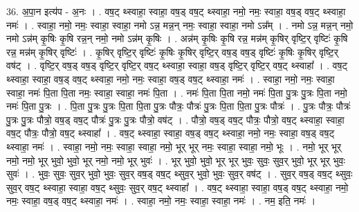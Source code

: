\documentclass[17pt]{extarticle}
\begin{document}
36. अ॒पा॒न इत्य॑प - अ॒नः । . वष॒ट् थ्स्वाहा॒ स्वाहा॒ वष॒ड् वष॒ट् थ्स्वाहा॒ नमो॒ नमः॒ स्वाहा॒ वष॒ड् वष॒ट् थ्स्वाहा॒ नमः॑ । . स्वाहा॒ नमो॒ नमः॒ स्वाहा॒ स्वाहा॒ नमो ऽन्न॒ मन्न॒न् नमः॒ स्वाहा॒ स्वाहा॒ नमो ऽन्न᳚म् । . नमो ऽन्न॒ मन्न॒न् नमो॒ नमो ऽन्न॑म् कृ॒षिः कृ॒षि रन्न॒न् नमो॒ नमो ऽन्न॑म् कृ॒षिः । . अन्न॑म् कृ॒षिः कृ॒षि रन्न॒ मन्न॑म् कृ॒षिर् वृष्टि॒र् वृष्टिः॑ कृ॒षि रन्न॒ मन्न॑म् कृ॒षिर् वृष्टिः॑ । . कृ॒षिर् वृष्टि॒र् वृष्टिः॑ कृ॒षिः कृ॒षिर् वृष्टि॒र् वष॒ड् वष॒ड् वृष्टिः॑ कृ॒षिः कृ॒षिर् वृष्टि॒र् वष॑ट् । . वृष्टि॒र् वष॒ड् वष॒ड् वृष्टि॒र् वृष्टि॒र् वष॒ट् थ्स्वाहा॒ स्वाहा॒ वष॒ड् वृष्टि॒र् वृष्टि॒र् वष॒ट् थ्स्वाहा᳚ । . वष॒ट् थ्स्वाहा॒ स्वाहा॒ वष॒ड् वष॒ट् थ्स्वाहा॒ नमो॒ नमः॒ स्वाहा॒ वष॒ड् वष॒ट् थ्स्वाहा॒ नमः॑ । . स्वाहा॒ नमो॒ नमः॒ स्वाहा॒ स्वाहा॒ नमः॑ पि॒ता पि॒ता नमः॒ स्वाहा॒ स्वाहा॒ नमः॑ पि॒ता । . नमः॑ पि॒ता पि॒ता नमो॒ नमः॑ पि॒ता पु॒त्रः पु॒त्रः पि॒ता नमो॒ नमः॑ पि॒ता पु॒त्रः । . पि॒ता पु॒त्रः पु॒त्रः पि॒ता पि॒ता पु॒त्रः पौत्रः॒ पौत्रः॑ पु॒त्रः पि॒ता पि॒ता पु॒त्रः पौत्रः॑ । . पु॒त्रः पौत्रः॒ पौत्रः॑ पु॒त्रः पु॒त्रः पौत्रो॒ वष॒ड् वष॒ट् पौत्रः॑ पु॒त्रः पु॒त्रः पौत्रो॒ वष॑ट् । . पौत्रो॒ वष॒ड् वष॒ट् पौत्रः॒ पौत्रो॒ वष॒ट् थ्स्वाहा॒ स्वाहा॒ वष॒ट् पौत्रः॒ पौत्रो॒ वष॒ट् थ्स्वाहा᳚ । . वष॒ट् थ्स्वाहा॒ स्वाहा॒ वष॒ड् वष॒ट् थ्स्वाहा॒ नमो॒ नमः॒ स्वाहा॒ वष॒ड् वष॒ट् थ्स्वाहा॒ नमः॑ । . स्वाहा॒ नमो॒ नमः॒ स्वाहा॒ स्वाहा॒ नमो॒ भूर् भूर् नमः॒ स्वाहा॒ स्वाहा॒ नमो॒ भूः । . नमो॒ भूर् भूर् नमो॒ नमो॒ भूर् भुवो॒ भुवो॒ भूर् नमो॒ नमो॒ भूर् भुवः॑ । . भूर् भुवो॒ भुवो॒ भूर् भूर् भुवः॒ सुवः॒ सुव॒र् भुवो॒ भूर् भूर् भुवः॒ सुवः॑ । . भुवः॒ सुवः॒ सुव॒र् भुवो॒ भुवः॒ सुव॒र् वष॒ड् वष॒ट् थ्सुव॒र् भुवो॒ भुवः॒ सुव॒र् वष॑ट् । . सुव॒र् वष॒ड् वष॒ट् थ्सुवः॒ सुव॒र् वष॒ट् थ्स्वाहा॒ स्वाहा॒ वष॒ट् थ्सुवः॒ सुव॒र् वष॒ट् थ्स्वाहा᳚ । . वष॒ट् थ्स्वाहा॒ स्वाहा॒ वष॒ड् वष॒ट् थ्स्वाहा॒ नमो॒ नमः॒ स्वाहा॒ वष॒ड् वष॒ट् थ्स्वाहा॒ नमः॑ । . स्वाहा॒ नमो॒ नमः॒ स्वाहा॒ स्वाहा॒ नमः॑ । . नम॒ इति॒ नमः॑ । \newline
\pagebreak
{}
\end{document}
